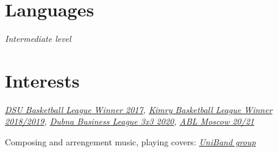 \documentclass[10pt]{article} %
\begin{document}

{
}

\section{Languages}

{
\textit{Intermediate level}\\
}

\section{Interests}

{
\textit{\href{https://vk.com/uni_dubna_basketbol}
{DSU Basketball League Winner 2017}, 
\href{https://vk.com/basketkimry}
{Kimry Basketball League Winner 2018/2019},
\href{https://play.fiba3x3.com/players/c0b5b2e1-d136-4a33-a60a-1e55667b5ef8/activity}
{Dubna Business League 3x3 2020},
\href{https://ablmoscow.ru/team/1384?seasonId=17}
{ABL Moscow 20/21}}
}

{Composing and arrengement music, playing covers: 
\textit{\href{https://vk.com/uni_band_dubna}
{UniBand group}}
}

\end{document}
